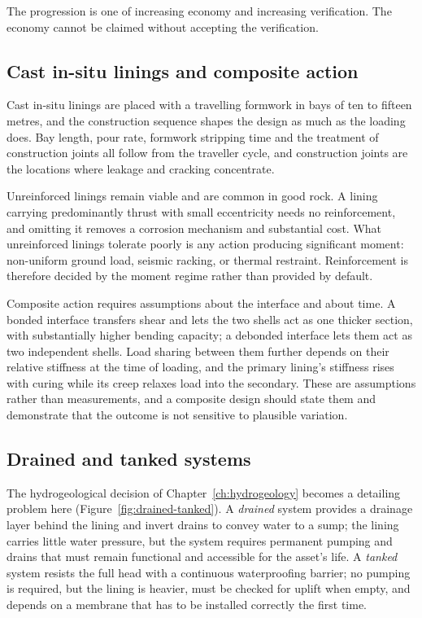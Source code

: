 The progression is one of increasing economy and increasing verification. The
economy cannot be claimed without accepting the verification.

\subsection{Cast in-situ linings and composite action}
\label{sec:cast-insitu-composite}

Cast in-situ linings are placed with a travelling formwork in bays of ten to
fifteen metres, and the construction sequence shapes the design as much as the
loading does. Bay length, pour rate, formwork stripping time and the treatment
of construction joints all follow from the traveller cycle, and construction
joints are the locations where leakage and cracking concentrate.

Unreinforced linings remain viable and are common in good rock. A lining
carrying predominantly thrust with small eccentricity needs no reinforcement,
and omitting it removes a corrosion mechanism and substantial cost. What
unreinforced linings tolerate poorly is any action producing significant
moment: non-uniform ground load, seismic racking, or thermal restraint.
Reinforcement is therefore decided by the moment regime rather than provided by default.

Composite action requires assumptions about the interface and about time. A
bonded interface transfers shear and lets the two shells act as one thicker
section, with substantially higher bending capacity; a debonded interface lets
them act as two independent shells. Load sharing between them further depends
on their relative stiffness at the time of loading, and the primary lining's
stiffness rises with curing while its creep relaxes load into the secondary.
These are assumptions rather than measurements, and a composite design should
state them and demonstrate that the outcome is not sensitive to plausible
variation.

\subsection{Drained and tanked systems}
\label{sec:drained-tanked-systems}

The hydrogeological decision of Chapter~\ref{ch:hydrogeology} becomes a
detailing problem here (Figure~\ref{fig:drained-tanked}). A \emph{drained} system provides a drainage layer behind the
lining and invert drains to convey water to a sump; the lining carries little
water pressure, but the system requires permanent pumping and drains that must
remain functional and accessible for the asset's life. A \emph{tanked} system
resists the full head with a continuous waterproofing barrier; no pumping
is required, but the lining is heavier, must be checked for uplift when empty, and
depends on a membrane that has to be installed correctly the first time.

